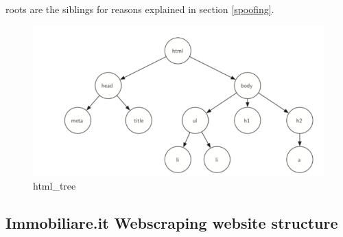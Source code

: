 \documentclass[
  12pt,
  a4paper,
  oneside]{book}
\begin{document}
roots are the siblings for reasons explained in section \ref{spoofing}.

\begin{figure}
\centering
\includegraphics{images/tree_html.PNG}
\caption{html\_tree}
\end{figure}

\hypertarget{webstructure}{%
\subsection{Immobiliare.it Webscraping website structure}\label{webstructure}}
\end{document}
